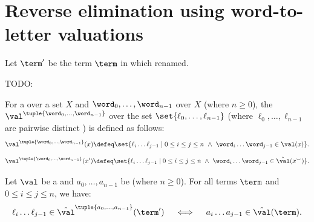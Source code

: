 \section{Reverse elimination using word-to-letter valuations}
Let $\term'$ be the term $\term$ in which renamed.

TODO:

\begin{definition}\label{definition: word-to-letter valuations reverse}
    For a  over a set $X$ and  $\word_0, \dots, \word_{n-1}$ over $X$ (where $n \ge 0$),
    the  $\val^{\tuple{\word_0, \dots, \word_{n-1}}}$ over the set $\set{\ell_0, \dots, \ell_{n-1}}$ (where $\ell_{0}, \dots, \ell_{n-1}$ are pairwise distinct ) is defined as follows:
    \[\val^{\tuple{\word_0, \dots, \word_{n-1}}}(x) \defeq \set{\ell_i \dots \ell_{j-1} \mid 0 \le i \le j \le n \  \land \  \word_i \dots \word_{j-1} \in \val(x)}.\]
    \[\val^{\tuple{\word_0, \dots, \word_{n-1}}}(x') \defeq \set{\ell_i \dots \ell_{j-1} \mid 0 \le i \le j \le n \  \land \  \word_i \dots \word_{j-1} \in \hat{\val}(x^{\smile})}.\]
\end{definition}
\begin{lemma}[cf.\ \cite{ }]\label{proposition: letter-to-letter valuations reverse}
    Let $\val$ be a  and $a_0, \dots, a_{n-1}$ be  (where $n \ge 0$).
    For all terms $\term$ and $0 \le i \le j \le n$, we have:
    \[\ell_{i} \dots \ell_{j-1} \in \hat{\val}^{\tuple{a_0, \dots, a_{n-1}}}(\term') \quad \iff \quad a_{i} \dots a_{j-1} \in \hat{\val}(\term).\]
\end{lemma}
